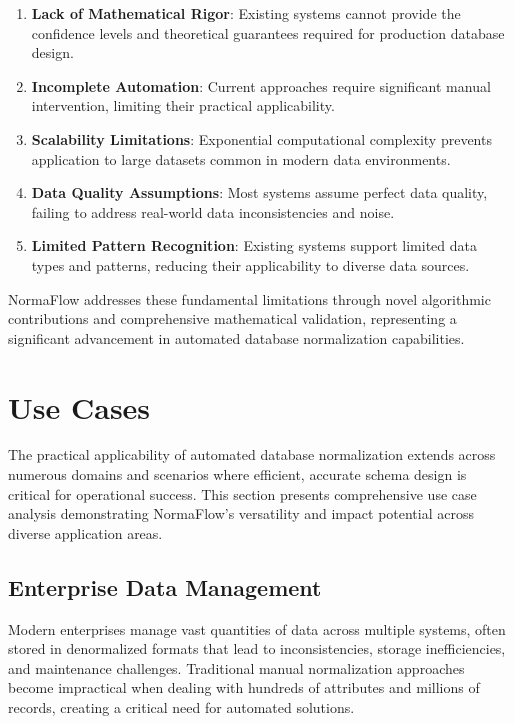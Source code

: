 \documentclass[acmsmall]{acmart}
\begin{document}
\begin{enumerate}
\item \textbf{Lack of Mathematical Rigor}: Existing systems cannot provide the confidence levels and theoretical guarantees required for production database design.
\item \textbf{Incomplete Automation}: Current approaches require significant manual intervention, limiting their practical applicability.
\item \textbf{Scalability Limitations}: Exponential computational complexity prevents application to large datasets common in modern data environments.
\item \textbf{Data Quality Assumptions}: Most systems assume perfect data quality, failing to address real-world data inconsistencies and noise.
\item \textbf{Limited Pattern Recognition}: Existing systems support limited data types and patterns, reducing their applicability to diverse data sources.
\end{enumerate}

NormaFlow addresses these fundamental limitations through novel algorithmic contributions and comprehensive mathematical validation, representing a significant advancement in automated database normalization capabilities.

\section{Use Cases}

The practical applicability of automated database normalization extends across numerous domains and scenarios where efficient, accurate schema design is critical for operational success. This section presents comprehensive use case analysis demonstrating NormaFlow's versatility and impact potential across diverse application areas.

\subsection{Enterprise Data Management}

Modern enterprises manage vast quantities of data across multiple systems, often stored in denormalized formats that lead to inconsistencies, storage inefficiencies, and maintenance challenges. Traditional manual normalization approaches become impractical when dealing with hundreds of attributes and millions of records, creating a critical need for automated solutions.
\end{document}
